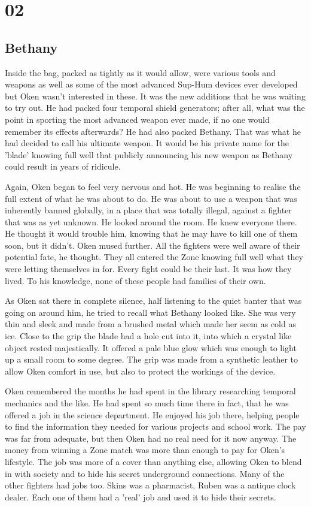 \chapter{02}
\section{Bethany}


Inside the bag, packed as tightly as it would allow, were various tools and weapons as well as some of the most advanced Sup-Hum devices ever developed but Oken wasn't interested in these.  It was the new additions that he was waiting to try out.  He had packed four temporal shield generators; after all, what was the point in sporting the most advanced weapon ever made, if no one would remember its effects afterwards?  He had also packed Bethany.  That was what he had decided to call his ultimate weapon.  It would be his private name for the 'blade' knowing full well that publicly announcing his new weapon as Bethany could result in years of ridicule.  

Again, Oken began to feel very nervous and hot.  He was beginning to realise the full extent of what he was about to do.  He was about to use a weapon that was inherently banned globally, in a place that was totally illegal, against a fighter that was as yet unknown.  He looked around the room.  He knew everyone there.  He thought it would trouble him, knowing that he may have to kill one of them soon, but it didn't.  Oken mused further.  All the fighters were well aware of their potential fate, he thought.  They all entered the Zone knowing full well what they were letting themselves in for.  Every fight could be their last.  It was how they lived.  To his knowledge, none of these people had families of their own. 

As Oken sat there in complete silence, half listening to the quiet banter that was going on around him, he tried to recall what Bethany looked like.  She was very thin and sleek and made from a brushed metal which made her seem as cold as ice.  Close to the grip the blade had a hole cut into it, into which a crystal like object rested majestically.  It offered a pale blue glow which was enough to light up a small room to some degree.  The grip was made from a synthetic leather to allow Oken comfort in use, but also to protect the workings of the device.   

Oken remembered the months he had spent in the library researching temporal mechanics and the like.  He had spent so much time there in fact, that he was offered a job in the science department.  He enjoyed his job there, helping people to find the information they needed for various projects and school work.  The pay was far from adequate, but then Oken had no real need for it now anyway.  The money from winning a Zone match was more than enough to pay for Oken's lifestyle.  The job was more of a cover than anything else, allowing Oken to blend in with society and to hide his secret underground connections.  Many of the other fighters had jobs too.  Skins was a pharmacist, Ruben was a antique clock dealer.  Each one of them had a 'real' job and used it to hide their secrets.

